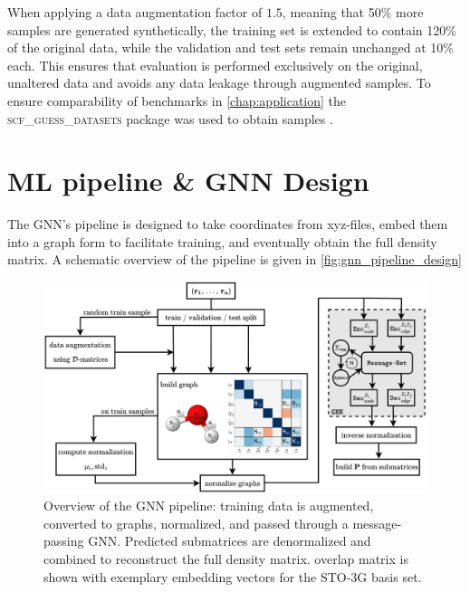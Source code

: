 When applying a data augmentation factor of $1.5$, meaning that 50\% more samples are generated synthetically, the training set is extended to contain 120\% of the original data, while the validation and test sets remain unchanged at 10\% each. This ensures that evaluation is performed exclusively on the original, unaltered data and avoids any data leakage through augmented samples. To ensure comparability of benchmarks in \autoref{chap:application} the \textsc{scf\_guess\_datasets} package was used to obtain samples \parencite{ref:milacher_scf_guess_datasets}.

\section{ML pipeline \& GNN Design}
\label{sec:gnn_design}
The GNN's pipeline is designed to take coordinates from xyz-files, embed them into a graph form to facilitate training, and eventually obtain the full density matrix. A schematic overview of the pipeline is given in \autoref{fig:gnn_pipeline_design}

\begin{figure}[H]
    \centering
    \includegraphics[width=\textwidth]{../fig/gnn/GNN_design.pdf}
    \caption[GNN pipeline design]{Overview of the GNN pipeline: training data is augmented, converted to graphs, normalized, and passed through a message-passing GNN. Predicted submatrices are denormalized and combined to reconstruct the full density matrix.  overlap matrix is shown with exemplary embedding vectors for the STO-3G basis set.}
    \label{fig:gnn_pipeline_design}
\end{figure}

